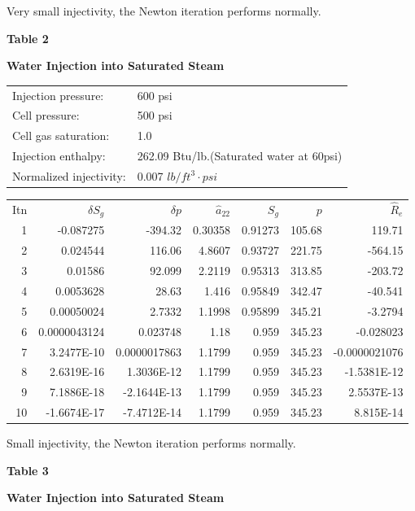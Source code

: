 \documentclass[11pt]{article}
\begin{document}
Very small injectivity, the Newton iteration performs normally.

\newpage
\centerline{\textbf{Table 2 }}
\centerline{\textbf{Water Injection into Saturated Steam}}
\vspace{20pt}

\begin{tabular}{ l l }
    Injection pressure: & 600 psi \\
    Cell pressure: & 500 psi \\
    Cell gas saturation: & 1.0 \\
    Injection enthalpy: & 262.09 Btu/lb.(Saturated water at 60psi) \\
    Normalized injectivity: & 0.007 $lb/ft^3\cdot psi$\\
\end{tabular}
\vspace{20pt}

\begin{table}[H]
\centering
\begin{tabular}{ r r r r r r r }
    Itn & $\delta S_g$ & $\delta p$ & $\hat{a}_{22}$ &
    $S_g$ & $p$ & $\hat{R}_e$ \\
    1 & -0.087275 & -394.32 & 0.30358 & 0.91273 & 105.68 & 119.71 \\
    2 & 0.024544 & 116.06 & 4.8607 & 0.93727 & 221.75 & -564.15 \\
    3 & 0.01586 & 92.099 & 2.2119 & 0.95313 & 313.85 & -203.72 \\
    4 & 0.0053628 & 28.63 & 1.416 & 0.95849 & 342.47 & -40.541 \\
    5 & 0.00050024 & 2.7332 & 1.1998 & 0.95899 & 345.21 & -3.2794 \\
    6 & 0.0000043124 & 0.023748 & 1.18 & 0.959 & 345.23 & -0.028023 \\
    7 & 3.2477E-10 & 0.0000017863 & 1.1799 & 0.959 & 345.23 & -0.0000021076 \\
    8 & 2.6319E-16 & 1.3036E-12 & 1.1799 & 0.959 & 345.23 & -1.5381E-12 \\
    9 & 7.1886E-18 & -2.1644E-13 & 1.1799 & 0.959 & 345.23 & 2.5537E-13 \\
    10 & -1.6674E-17 & -7.4712E-14 & 1.1799 & 0.959 & 345.23 & 8.815E-14 \\
\end{tabular}
\end{table}

Small injectivity, the Newton iteration performs normally.

\newpage
\centerline{\textbf{Table 3 }}
\centerline{\textbf{Water Injection into Saturated Steam}}
\vspace{20pt}
\end{document}
